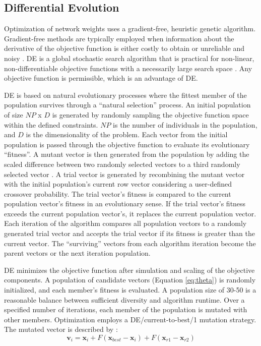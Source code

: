 \subsection{Differential Evolution}
\label{subsec:04de}

Optimization of network weights uses a gradient-free, heuristic genetic algorithm. Gradient-free methods are typically employed when information about the derivative of the objective function is either costly to obtain or unreliable and noisy \citep{conn2009introduction}. \Gls{DE} is a global stochastic search algorithm that is practical for non-linear, non-differentiable objective functions with a necessarily large search space \citep{rios2013derivativefree}. Any objective function is permissible, which is an advantage of \gls{DE}.

\Gls{DE} is based on natural evolutionary processes where the fittest member of the population survives through a ``natural selection'' process. An initial population of size $NP$ x $D$ is generated by randomly sampling the objective function space within the defined constraints. $NP$ is the number of individuals in the population, and $ D $ is the dimensionality of the problem. Each vector from the initial population is passed through the objective function to evaluate its evolutionary ``fitness''. A mutant vector is then generated from the population by adding the scaled difference between two randomly selected vectors to a third randomly selected vector \citep{price2013differential}. A trial vector is generated by recombining the mutant vector with the initial population's current row vector considering a user-defined crossover probability. The trial vector's fitness is compared to the current population vector's fitness in an evolutionary sense. If the trial vector's fitness exceeds the current population vector's, it replaces the current population vector. Each iteration of the algorithm compares all population vectors to a randomly generated trial vector and accepts the trial vector if its fitness is greater than the current vector. The ``surviving'' vectors from each algorithm iteration become the parent vectors or the next iteration population.

\Gls{DE} minimizes the objective function after simulation and scaling of the objective components. A population of candidate vectors (Equation \ref{eq:theta}) is randomly initialized, and each member's fitness is evaluated. A population size of 30-50 is a reasonable balance between sufficient diversity and algorithm runtime. Over a specified number of iterations, each member of the population is mutated with other members. Optimization employs a DE/current-to-best/1 mutation strategy. The mutated vector is described by \citep{georgioudakis2020comparative}:
\begin{equation}
    \mathbf{v}_{i} = \mathbf{x}_{i} + F(\mathbf{x}_{best}-\mathbf{x}_{i}) + F(\mathbf{x}_{r1} - \mathbf{x}_{r2})
    \label{eq:mutation}
\end{equation}


